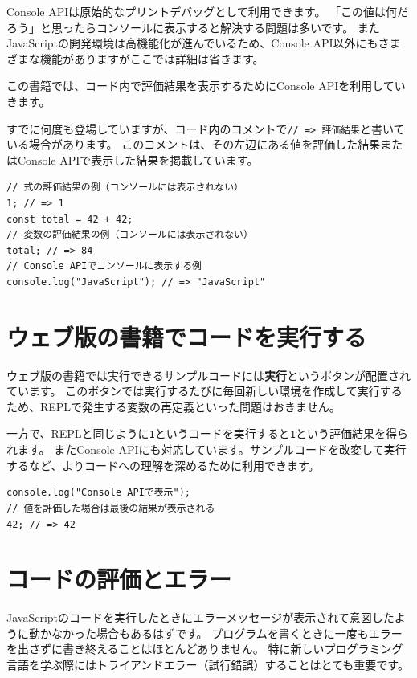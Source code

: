 Console APIは原始的なプリントデバッグとして利用できます。
「この値は何だろう」と思ったらコンソールに表示すると解決する問題は多いです。
またJavaScriptの開発環境は高機能化が進んでいるため、Console
API以外にもさまざまな機能がありますがここでは詳細は省きます。

この書籍では、コード内で評価結果を表示するためにConsole
APIを利用していきます。

すでに何度も登場していますが、コード内のコメントで\texttt{// => 評価結果}と書いている場合があります。
このコメントは、その左辺にある値を評価した結果またはConsole
APIで表示した結果を掲載しています。

\begin{lstlisting}
// 式の評価結果の例（コンソールには表示されない）
1; // => 1
const total = 42 + 42;
// 変数の評価結果の例（コンソールには表示されない）
total; // => 84
// Console APIでコンソールに表示する例
console.log("JavaScript"); // => "JavaScript"
\end{lstlisting}

\hypertarget{execute-on-web}{%
\section{ウェブ版の書籍でコードを実行する}\label{execute-on-web}}

ウェブ版の書籍では実行できるサンプルコードには\textbf{実行}というボタンが配置されています。
このボタンでは実行するたびに毎回新しい環境を作成して実行するため、REPLで発生する変数の再定義といった問題はおきません。

一方で、REPLと同じように\texttt{1}というコードを実行すると\texttt{1}という評価結果を得られます。
またConsole
APIにも対応しています。サンプルコードを改変して実行するなど、よりコードへの理解を深めるために利用できます。

\begin{lstlisting}
console.log("Console APIで表示");
// 値を評価した場合は最後の結果が表示される
42; // => 42
\end{lstlisting}

\hypertarget{eval-code-and-error}{%
\section{コードの評価とエラー}\label{eval-code-and-error}}

JavaScriptのコードを実行したときにエラーメッセージが表示されて意図したように動かなかった場合もあるはずです。
プログラムを書くときに一度もエラーを出さずに書き終えることはほとんどありません。
特に新しいプログラミング言語を学ぶ際にはトライアンドエラー（試行錯誤）することはとても重要です。

